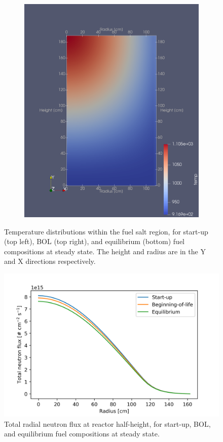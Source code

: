 \documentclass{anstrans}
\begin{document}
\begin{figure}
\begin{subfigure}{1\columnwidth}
\end{subfigure}\hfill\\
\bigskip
\centering
\begin{subfigure}{1\columnwidth}
\includegraphics[width=\columnwidth]{./figures/eqtemp}%
\label{subfigc}%
\end{subfigure}%
\captionsetup{justification=centering}
\caption{Temperature distributions within the fuel salt region, for start-up
(top left), \gls{BOL} (top right), and equilibrium (bottom) fuel compositions at steady state. The height and radius are in the Y and X directions
respectively.}
\label{fig:temp}
\end{figure}
%
\begin{figure}[H] 
	\centering
	\includegraphics[width=.53\textwidth]{./figures/totalflux}
	\captionsetup{justification=centering}
	\caption{Total radial neutron flux at reactor half-height, for start-up,
	\gls{BOL}, and equilibrium fuel compositions at steady state.}
	\label{fig:totalflux}
\end{figure} 
\end{document}
